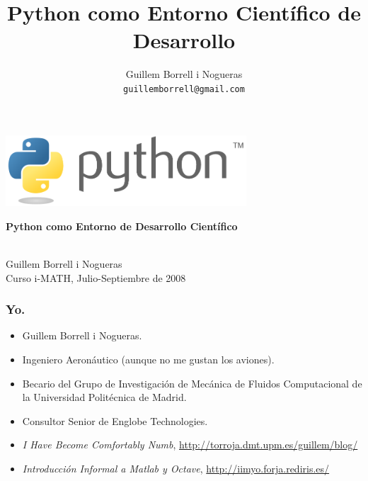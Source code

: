 \documentclass{beamer}
\title{Python como Entorno Científico de Desarrollo}
\author{
Guillem Borrell i Nogueras\\
\texttt{guillemborrell@gmail.com}
}
\begin{document}

\begin{frame}
\begin{center}
 \includegraphics[width=9cm]{files/python-logo-generic.pdf}\\
\begin{large}
\textbf{Python como Entorno de Desarrollo Científico}
\end{large}\\

Guillem Borrell i Nogueras\\

Curso i-MATH, Julio-Septiembre de 2008
\end{center}

\end{frame}


\begin{frame}
  \frametitle{Yo.}
  \begin{itemize}
  \item Guillem Borrell i Nogueras.
  \item Ingeniero Aeronáutico (aunque no me gustan los aviones).
  \item Becario del Grupo de Investigación de Mecánica de Fluidos
    Computacional de la Universidad Politécnica de Madrid.
  \item Consultor Senior de Englobe Technologies.
  \item \textit{I Have Become Comfortably Numb},
    \url{http://torroja.dmt.upm.es/guillem/blog/}
  \item \textit{Introducción Informal a Matlab y Octave},
    \url{http://iimyo.forja.rediris.es/}
  \end{itemize}
\end{frame}
\end{document}

